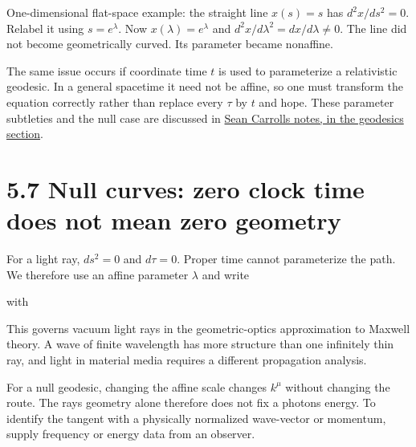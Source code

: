 \documentclass[
  11pt,
  letterpaper,
  oneside,
  openany]{scrbook}
\begin{document}
One-dimensional flat-space example: the straight line \(x(s)=s\) has
\(d^2x/ds^2=0\). Relabel it using \(s=e^\lambda\). Now
\(x(\lambda)=e^\lambda\) and \(d^2x/d\lambda^2=dx/d\lambda\ne0\). The
line did not become geometrically curved. Its parameter became
nonaffine.

The same issue occurs if coordinate time \(t\) is used to parameterize a
relativistic geodesic. In a general spacetime it need not be affine, so
one must transform the equation correctly rather than replace every
\(\tau\) by \(t\) and hope. These parameter subtleties and the null case
are discussed in \href{https://arxiv.org/pdf/gr-qc/9712019}{Sean
Carroll\textquotesingle s notes, in the geodesics section}.

\hypertarget{null-curves-zero-clock-time-does-not-mean-zero-geometry}{%
\section{5.7 Null curves: zero clock time does not mean zero
geometry}\label{null-curves-zero-clock-time-does-not-mean-zero-geometry}}

For a light ray, \(ds^2=0\) and \(d\tau=0\). Proper time cannot
parameterize the path. We therefore use an affine parameter \(\lambda\)
and write

\begin{center}
\begingroup
{}
\ifdim\wd\grmathbox>\linewidth
\resizebox{\linewidth}{!}{\usebox{\grmathbox}}
\else\usebox{\grmathbox}\fi
\endgroup
\end{center}

with

\begin{center}
\begingroup
{}
\ifdim\wd\grmathbox>\linewidth
\resizebox{\linewidth}{!}{\usebox{\grmathbox}}
\else\usebox{\grmathbox}\fi
\endgroup
\end{center}

This governs vacuum light rays in the geometric-optics approximation to
Maxwell theory. A wave of finite wavelength has more structure than one
infinitely thin ray, and light in material media requires a different
propagation analysis.

For a null geodesic, changing the affine scale changes \(k^\mu\) without
changing the route. The ray\textquotesingle s geometry alone therefore
does not fix a photon\textquotesingle s energy. To identify the tangent
with a physically normalized wave-vector or momentum, supply frequency
or energy data from an observer.
\end{document}
